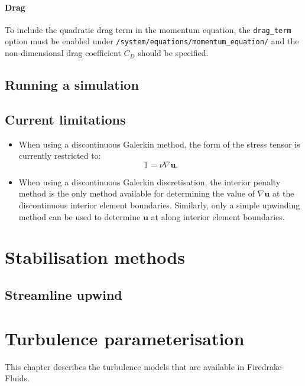\documentclass[a4paper,11pt]{report}
\begin{document}
\subsubsection{Drag}
To include the quadratic drag term in the momentum equation, the \texttt{drag\_term} option must be enabled under \texttt{/system/equations/momentum\_equation/} and the non-dimensional drag coefficient $C_D$ should be specified.

 
\section{Running a simulation}

\section{Current limitations}
\begin{itemize}
   \item When using a discontinuous Galerkin method, the form of the stress tensor is currently restricted to:
   \begin{equation}
      \mathbb{T} = \nu\nabla\mathbf{u}.
   \end{equation}
   \item When using a discontinuous Galerkin discretisation, the interior penalty method is the only method available for determining the value of $\nabla\mathbf{u}$ at the discontinuous interior element boundaries. Similarly, only a simple upwinding method can be used to determine $\mathbf{u}$ at along interior element boundaries.
\end{itemize}


\chapter{Stabilisation methods}\label{chap:stabilisation}

\section{Streamline upwind}


\chapter{Turbulence parameterisation}
This chapter describes the turbulence models that are available in Firedrake-Fluids.
\end{document}
